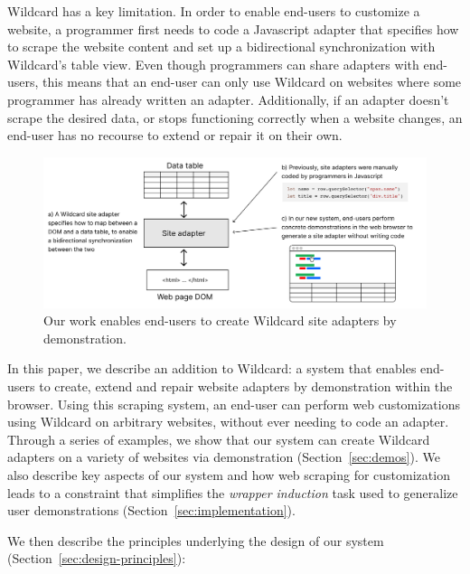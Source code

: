 \documentclass[sigconf,10pt]{acmart}
\begin{document}
Wildcard has a key limitation. In order to enable end-users to customize
a website, a programmer first needs to code a Javascript adapter that
specifies how to scrape the website content and set up a bidirectional
synchronization with Wildcard's table view. Even though programmers can
share adapters with end-users, this means that an end-user can only use
Wildcard on websites where some programmer has already written an
adapter. Additionally, if an adapter doesn't scrape the desired data, or
stops functioning correctly when a website changes, an end-user has no
recourse to extend or repair it on their own.

\begin{figure}
  \includegraphics[width=\textwidth]{media/overview.png}
  \caption{\label{fig:overview}Our work enables end-users to create Wildcard site adapters by demonstration.}
\end{figure}

In this paper, we describe an addition to Wildcard: a system that
enables end-users to create, extend and repair website adapters by
demonstration within the browser. Using this scraping system, an
end-user can perform web customizations using Wildcard on arbitrary
websites, without ever needing to code an adapter. Through a series of
examples, we show that our system can create Wildcard adapters on a
variety of websites via demonstration (Section~\ref{sec:demos}). We also
describe key aspects of our system and how web scraping for
customization leads to a constraint that simplifies the \emph{wrapper
induction} \citep{kushmerick2000} task used to generalize user
demonstrations (Section~\ref{sec:implementation}).

We then describe the principles underlying the design of our system
(Section~\ref{sec:design-principles}):
\end{document}
